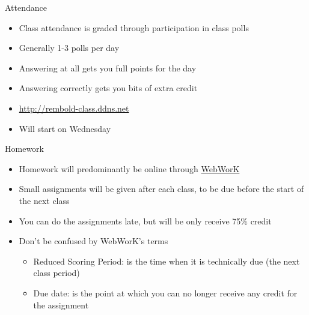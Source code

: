 \documentclass[pdf,aspectratio=169]{beamer}
\begin{document}
\begin{frame}{Attendance}
	\begin{itemize}
	  \item Class attendance is graded through participation in class polls
	  \item Generally 1-3 polls per day
	  \item Answering at all gets you full points for the day
	  \item Answering correctly gets you bits of extra credit
	  \item \url{http://rembold-class.ddns.net}
	  \item Will start on Wednesday
	\end{itemize}
\end{frame}

\begin{frame}{Homework}
  \begin{itemize}
	  \item Homework will predominantly be online through \alert{\href{https://secure.willamette.edu/webwork2/Physics110/}{WebWorK}}
	\item Small assignments will be given after each class, to be due before the start of the next class
	\item You can do the assignments late, but will be only receive 75\% credit
	\item Don't be confused by WebWorK's terms
		\begin{itemize}
			\item Reduced Scoring Period: is the time when it is technically due (the next class period)
			\item Due date: is the point at which you can no longer receive \alert{any} credit for the assignment
		\end{itemize}
  \end{itemize}
\end{frame}
\end{document}
